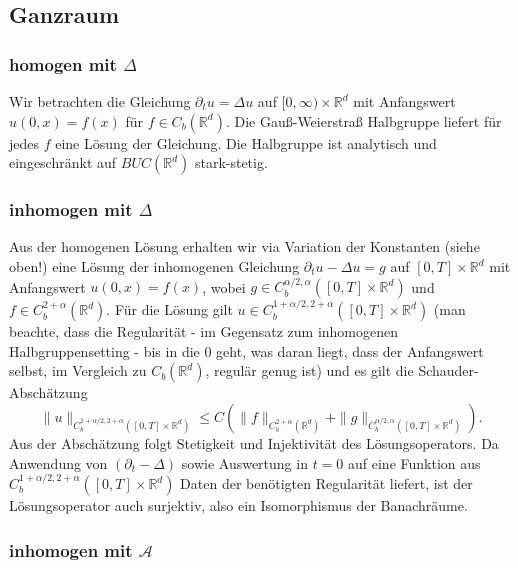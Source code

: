 \documentclass[11pt,a4paper]{scrartcl}
\newcommand{\R}{\mathbb{R}} %
\newcommand{\A}{\mathcal{A}}
\theoremstyle{plain}
\theoremstyle{definition}
\theoremstyle{remark}
\begin{document}
\subsection{Ganzraum}

\subsubsection{homogen mit $\Delta$}

Wir betrachten die Gleichung $\partial_t u = \Delta u$ auf $[0,\infty)\times \R^d$ mit Anfangswert $u(0,x)=f(x)$ für $f\in C_b(\R^d)$. Die Gauß-Weierstraß Halbgruppe liefert für jedes $f$ eine Lösung der Gleichung. Die Halbgruppe ist analytisch und eingeschränkt auf $BUC(\R^d)$ stark-stetig.

\subsubsection{inhomogen mit $\Delta$}

Aus der homogenen Lösung erhalten wir via Variation der Konstanten (siehe oben!) eine Lösung der inhomogenen Gleichung $\partial_t u - \Delta u = g$ auf $[0,T]\times \R^d$ mit Anfangswert $u(0,x)=f(x)$, wobei $g\in C_b^{\alpha/2,\alpha}([0,T]\times \R^d)$ und $f\in C_b^{2+\alpha}(\R^d)$. Für die Lösung gilt $u\in C_b^{1+\alpha/2, 2+\alpha}([0,T]\times \R^d)$ (man beachte, dass die Regularität - im Gegensatz zum inhomogenen Halbgruppensetting - bis in die $0$ geht, was daran liegt, dass der Anfangswert selbst, im Vergleich zu $C_b(\R^d)$, regulär genug ist) und es gilt die Schauder-Abschätzung $$\|u\|_{C_b^{1+\alpha/2, 2+\alpha}([0,T]\times \R^d)}\leq C \left( \|f\|_{C_b^{2+\alpha}(\R^d)} + \|g\|_{C_b^{\alpha/2,\alpha}([0,T]\times \R^d)} \right).$$ Aus der Abschätzung folgt Stetigkeit und Injektivität des Lösungsoperators. Da Anwendung von $(\partial_t - \Delta)$ sowie Auswertung in $t=0$ auf eine Funktion aus $C_b^{1+\alpha/2, 2+\alpha}([0,T]\times \R^d)$ Daten der benötigten Regularität liefert, ist der Lösungsoperator auch surjektiv, also ein Isomorphismus der Banachräume.

\subsubsection{inhomogen mit $\A$}
\end{document}
